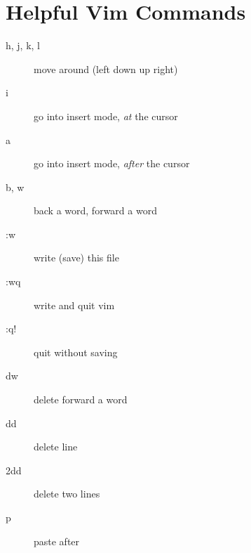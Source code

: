 \documentclass{article}
\begin{document}
\section*{Helpful Vim Commands}
\begin{multicols}{2}
    \begin{description}
        \item[h, j, k, l] move around (left down up right)
        \item[i] go into insert mode, \textit{at} the cursor
        \item[a] go into insert mode, \textit{after} the cursor
        \item[b, w] back a word, forward a word
        \item[:w] write (save) this file
        \item[:wq] write and quit vim
        \item[:q!] quit without saving
        \item[dw] delete forward a word
        \item[dd] delete line
        \item[2dd] delete two lines
        \item[p] paste after
    \end{description}
\end{multicols}
\end{document}
